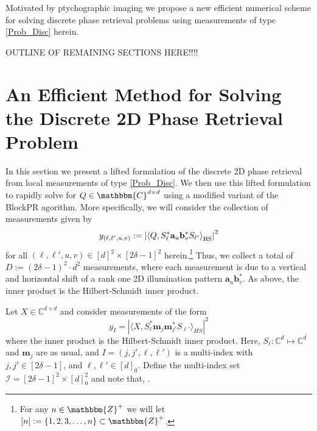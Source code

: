 \documentclass[]{spie}  %
\def \a {\mathbf a}
\def \b {\mathbf b}
\def \m {\mathbf m}
\def \jj {{j'}}
\def \elll {{\ell'}}
\begin{document}
Motivated by ptychographic imaging we propose a new efficient numerical scheme for solving discrete phase retrieval problems using measurements of type \eqref{Prob_Disc} herein.  

OUTLINE OF REMAINING SECTIONS HERE!!!!

\section{An Efficient Method for Solving the Discrete 2D Phase Retrieval Problem}

In this section we present a lifted formulation\cite{candes2013phaselift} of the discrete 2D phase retrieval from local measurements of type \eqref{Prob_Disc}.  We then use this lifted formulation to rapidly solve for $Q \in \mathbbm{C}^{d \times d}$ using a modified variant of the BlockPR agorithm\cite{iwen2016fast,iwen2016phase}.  More specifically, we will consider the collection of measurements given by 
$$y_{(\ell,\ell',u,v)} := \left| \left\langle Q, S^*_{\ell} \a_u \b_v^* S_{\ell'} \right\rangle_{\rm HS} \right|^2$$
for all $(\ell,\ell',u,v) \in [d]^2 \times [2\delta-1]^2$ herein.\footnote{For any $n \in \mathbbm{Z}^+$ we will let $[n] := \{ 1, 2, 3, \dots, n \} \subset \mathbbm{Z}^+$.}  Thus, we collect a total of $D := (2\delta-1)^2 \cdot d^2 $ measurements, where each measurement is due to a vertical and horizontal shift of a rank one 2D illumination pattern $\a_u \b_v^*$.  As above, the inner product is the Hilbert-Schmidt inner product.  



Let $X\in \mathbb{C}^{d\times d}$ and consider measurements of the form $$y_I = |\langle  X, S_\ell^*\m_j \m_\jj^*S_\elll \rangle_{HS}|^2$$
where the inner product is the Hilbert-Schmidt inner product. Here, $S_\ell: \mathbb{C}^d \mapsto \mathbb{C}^d$ and $\m_j$ are as usual, and $I=(j,\jj,\ell,\elll)$ is a multi-index with $j,\jj \in [2\delta-1]$, and $\ell, \elll \in [d]_0$. Define the multi-index set $\mathcal{I} = [2\delta-1]^2 \times [d]_0^2$  and note that, .


\end{document}
